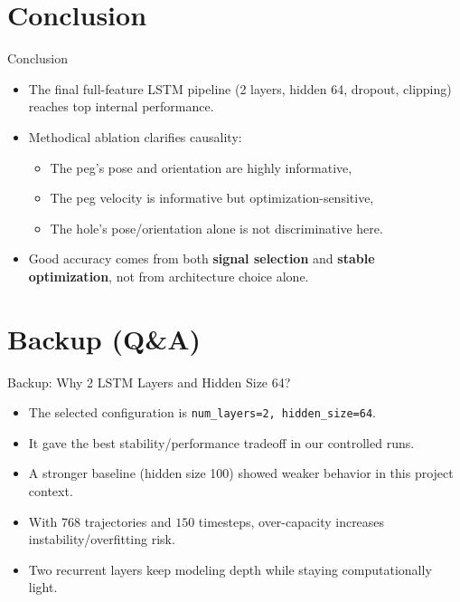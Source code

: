 \section{Conclusion}
\begin{frame}{Conclusion}
\small
\begin{itemize}[<+->]
  \item The final full-feature LSTM pipeline (2 layers, hidden 64, dropout, clipping) reaches top internal performance.
  \item Methodical ablation clarifies causality:
  \begin{itemize}[<+->]
    \item The peg's pose and orientation are highly informative,
    \item The peg velocity is informative but optimization-sensitive,
    \item The hole's pose/orientation alone is not discriminative here.
  \end{itemize}
  \item Good accuracy comes from both \textbf{signal selection} and \textbf{stable optimization}, not from architecture choice alone.
\end{itemize}
\end{frame}

\appendix
\section{Backup (Q\&A)}

\begin{frame}{Backup: Why 2 LSTM Layers and Hidden Size 64?}
\small
\begin{itemize}[<+->]
  \item The selected configuration is \texttt{num\_layers=2, hidden\_size=64}.
  \item It gave the best stability/performance tradeoff in our controlled runs.
  \item A stronger baseline (hidden size 100) showed weaker behavior in this project context.
  \item With \(768\) trajectories and \(150\) timesteps, over-capacity increases instability/overfitting risk.
  \item Two recurrent layers keep modeling depth while staying computationally light.
\end{itemize}
\end{frame}

